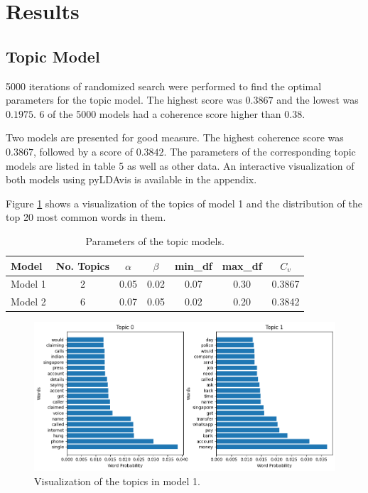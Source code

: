 \section{Results}

\subsection{Topic Model}

5000 iterations of randomized search were performed to find the optimal parameters for the topic model. The highest score was $0.3867$ and the lowest was $0.1975$. 6 of the 5000 models had a coherence score higher than $0.38$.

Two models are presented for good measure. The highest coherence score was $0.3867$, followed by a score of $0.3842$. The parameters of the corresponding topic models are listed in table 5 as well as other data. An interactive visualization of both models using pyLDAvis is available in the appendix.

Figure \ref{fig:topic_model_1} shows a visualization of the topics of model 1 and the distribution of the top 20 most common words in them.

\begin{table}[!h]
    \centering
    \begin{tabular}[\textwidth]{lcccccc}
        \hline
        \textbf{Model}  & No. Topics & $\alpha$ & $\beta$ & min\_df & max\_df & $C_v$ \\ \hline
        Model 1 & 2 & 0.05 & 0.02 & 0.07 & 0.30 & 0.3867 \\
        Model 2 & 6 & 0.07 & 0.05 & 0.02 & 0.20 & 0.3842 \\ \hline
    \end{tabular}
    \caption{Parameters of the topic models.}
\end{table}

\begin{figure}[H]
    \centering
    \includegraphics[width=\textwidth]{resources/model_n_2.png}
    \caption{Visualization of the topics in model 1.}
    \label{fig:topic_model_1}
\end{figure}

